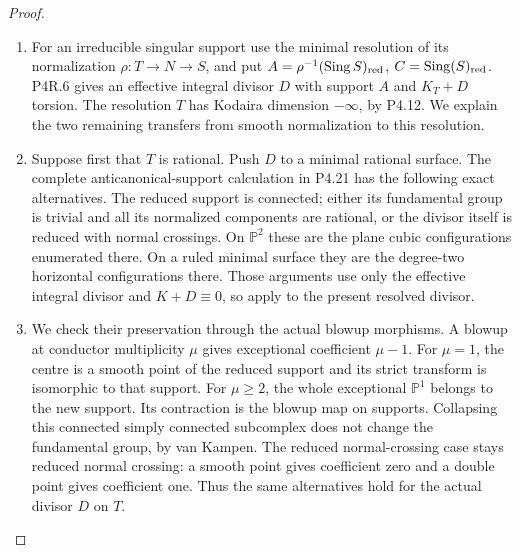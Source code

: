 \begin{proof}

\begin{enumerate}[label={$\langle1\rangle$\arabic*.},leftmargin=*]
\item For an irreducible singular support use the
minimal resolution of its normalization
$\rho:T\to N\to S$, and put
$A=\rho^{-1}(\operatorname{Sing}S)_{\rm red}$,
$C=\operatorname{Sing}(S)_{\rm red}$.
P4R.6 gives an effective integral divisor
$D$ with support $A$ and $K_T+D$ torsion.
The resolution $T$ has Kodaira dimension
$-\infty$, by P4.12. We explain the two
remaining transfers from smooth
normalization to this resolution.

\item Suppose first that $T$ is rational.
Push $D$ to a minimal rational surface.
The complete anticanonical-support calculation
in P4.21 has the following exact alternatives.
The reduced support is connected; either
its fundamental group is trivial and all
its normalized components are rational,
or the divisor itself is reduced with
normal crossings. On $\mathbb P^2$ these
are the plane cubic configurations
enumerated there. On a ruled minimal
surface they are the degree-two horizontal
configurations there. Those arguments use
only the effective integral divisor and
$K+D\equiv0$, so apply to the present
resolved divisor.

\item We check their preservation through the
actual blowup morphisms. A blowup at
conductor multiplicity $\mu$ gives
exceptional coefficient $\mu-1$.
For $\mu=1$, the centre is a smooth
point of the reduced support and its
strict transform is isomorphic to that
support. For $\mu\ge2$, the whole
exceptional $\mathbb P^1$ belongs to
the new support. Its contraction is
the blowup map on supports. Collapsing
this connected simply connected
subcomplex does not change the
fundamental group, by van Kampen.
The reduced normal-crossing case stays
reduced normal crossing: a smooth
point gives coefficient zero and a
double point gives coefficient one.
Thus the same alternatives hold for
the actual divisor $D$ on $T$.


\end{enumerate}
\end{proof}
